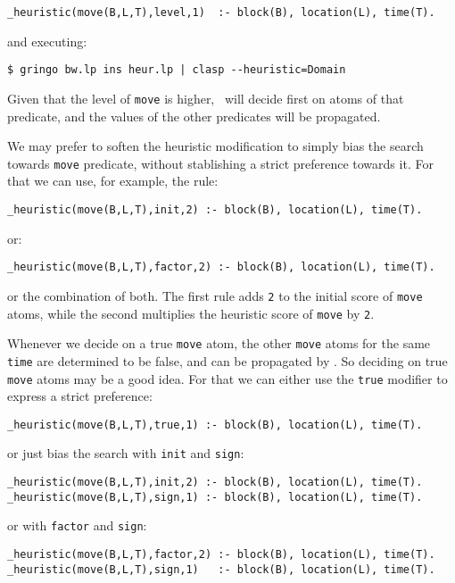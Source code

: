 \begin{verbatim}
_heuristic(move(B,L,T),level,1)  :- block(B), location(L), time(T).\end{verbatim}

and executing:
\begin{verbatim}
$ gringo bw.lp ins heur.lp | clasp --heuristic=Domain \end{verbatim}

Given that the level of \texttt{move} is higher,  \clasp\ will decide first on atoms of that predicate,  
and the values of the other predicates will be propagated. 

We may prefer to soften the heuristic modification to simply bias the search  towards \texttt{move} predicate, 
without stablishing a strict preference towards it.  For that we can use, for example, the rule: 
\begin{verbatim}
_heuristic(move(B,L,T),init,2) :- block(B), location(L), time(T).\end{verbatim} or: 
\begin{verbatim}
_heuristic(move(B,L,T),factor,2) :- block(B), location(L), time(T).\end{verbatim}

or the combination of both.  The first rule adds \texttt{2} to the initial score of \texttt{move} atoms,  
while the second multiplies the heuristic score of \texttt{move} by \texttt{2}.  

Whenever we decide on a true \texttt{move} atom,  the other \texttt{move} atoms for the same \texttt{time} are determined to be false,  
and can be propagated by \clasp. So deciding on true \texttt{move} atoms may be a good idea. 
For that we can either use the \texttt{true} modifier to express a strict preference: 
\begin{verbatim}
_heuristic(move(B,L,T),true,1) :- block(B), location(L), time(T).\end{verbatim}

or just bias the search with \texttt{init} and \texttt{sign}:
\begin{verbatim}
_heuristic(move(B,L,T),init,2) :- block(B), location(L), time(T).
_heuristic(move(B,L,T),sign,1) :- block(B), location(L), time(T).\end{verbatim}

or with \texttt{factor} and \texttt{sign}:
\begin{verbatim}
_heuristic(move(B,L,T),factor,2) :- block(B), location(L), time(T).
_heuristic(move(B,L,T),sign,1)   :- block(B), location(L), time(T).\end{verbatim}




